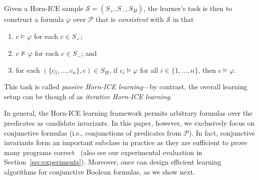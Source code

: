 Given a Horn-ICE sample $\mathcal S = (S_+, S_-, S_H)$, the learner's task is then to construct a formula $\varphi$ over $\mathcal P$ that is \emph{consistent} with $\mathcal S$ in that
\begin{enumerate}[label={\alph*)}]
    \item $c \models \varphi$ for each $c \in S_+$;
    \item $c\not \models \varphi$ for each $c \in S_-$; and
    \item for each $(\{ c_1, \ldots, c_n \}, c) \in S_H$, if $c_i \models \varphi$ for all $i \in \{ 1, \ldots, n \}$, then $c \models \varphi$.
\end{enumerate}
This task is called \emph{passive Horn-ICE learning}---by contrast, the overall learning setup can be though of as \emph{iterative Horn-ICE learning}.

In general, the Horn-ICE learning framework permits arbitrary formulas over the predicates as candidate invariants.
In this paper, however, we exclusively focus on conjunctive formulas (i.e., conjunctions of predicates from $\mathcal P$). %
In fact, conjunctive invariants form an important subclass in practice as they are sufficient to prove many programs correct~\cite{DBLP:conf/fm/FlanaganL01,DBLP:conf/tacas/Neider0MS018} (also see our experimental evaluation in Section~\ref{sec:experiments}).
Moreover, once can design efficient learning algorithms for conjunctive Boolean formulas, as we show next.
